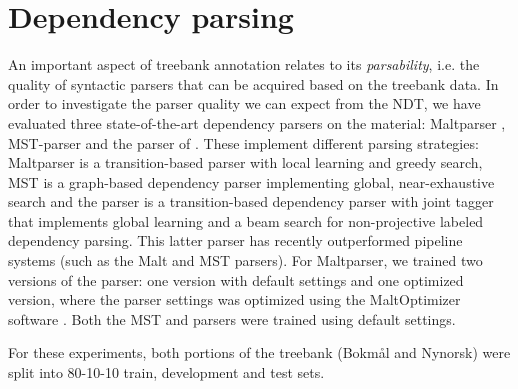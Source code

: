 \documentclass[11pt,a4paper]{article}
\begin{document}
\section{Dependency parsing}
An important aspect of treebank annotation relates to its \emph{parsability},
i.e. the quality of syntactic parsers that can be acquired based on
the treebank data.  In order to investigate the parser quality we can
expect from the NDT, we have evaluated three state-of-the-art dependency
parsers on the material: Maltparser ,
MST-parser  and the parser of
. These implement different parsing strategies: Maltparser is a transition-based parser with local learning and greedy search, MST is a graph-based dependency parser implementing global, near-exhaustive search and the  parser is a transition-based dependency parser with joint tagger that
implements global learning and a beam search for non-projective labeled
dependency parsing. 
This latter parser has recently outperformed pipeline systems (such as the
Malt and MST parsers).
For Maltparser, we trained two versions of the
parser: one version with default settings and one optimized version,
where the parser settings was optimized using the MaltOptimizer
software . Both the MST and 
parsers were trained using default settings.

For these experiments, both portions of the treebank (Bokm{\aa}l and
Nynorsk) were split into 80-10-10 train, development and test sets.




\end{document}
